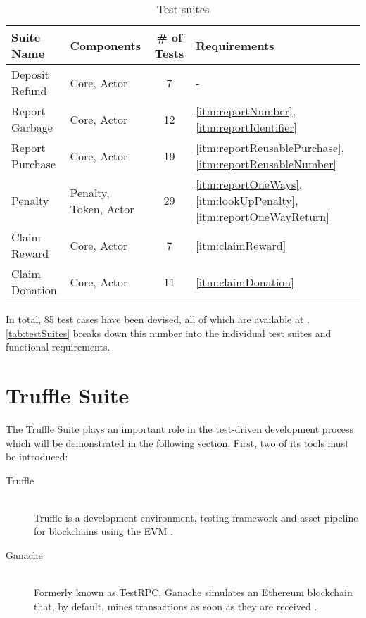 \begin{table}[hbt]
	\centering
  	\begin{tabular}{l|l|c|l}
	    Suite Name & Components & \# of Tests & Requirements \\
	    \hline
	    Deposit Refund & Core, Actor & 7 & - \\
	    Report Garbage & Core, Actor & 12 & \ref{itm:reportNumber}, \ref{itm:reportIdentifier} \\
	    Report Purchase & Core, Actor & 19 & \ref{itm:reportReusablePurchase}, \ref{itm:reportReusableNumber} \\
		Penalty & Penalty, Token, Actor & 29 & \ref{itm:reportOneWays}, \ref{itm:lookUpPenalty}, \ref{itm:reportOneWayReturn} \\ 
		Claim Reward & Core, Actor & 7 & \ref{itm:claimReward} \\
		Claim Donation & Core, Actor & 11 & \ref{itm:claimDonation} \\
  	\end{tabular}
  	\caption{Test suites}
  	\label{tab:testSuites}
\end{table}

\FloatBarrier

In total, 85 test cases have been devised, all of which are available at \cite{depositRefundGitHub}. \autoref{tab:testSuites} breaks down this number into the individual test suites and functional requirements.

\pagebreak

\section{Truffle Suite}
The Truffle Suite plays an important role in the test-driven development process which will be demonstrated in the following section. First, two of its tools must be introduced:

\begin{description}
  \item[Truffle]
  \hfill \\
  Truffle is a development environment, testing framework and asset pipeline for blockchains using the \ac{EVM} \cite[Truffle Overview]{truffleSuite}.
  \item[Ganache]
  \hfill \\
  Formerly known as TestRPC, Ganache simulates an Ethereum blockchain that, by default, mines transactions as soon as they are received \cite[Ganache Quickstart]{truffleSuite}. 
\end{description}

